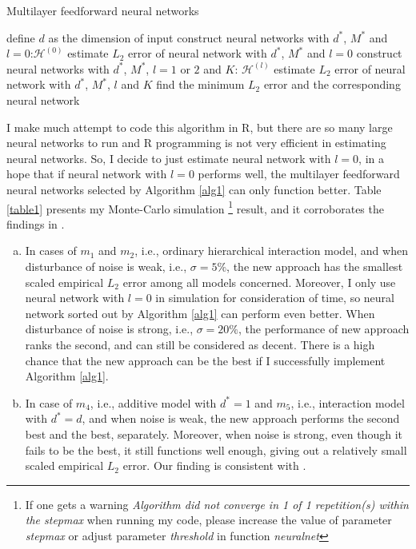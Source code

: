 \begin{tcolorbox}[standard jigsaw, opacityback=0]
\begin{algorithm}[H]
\caption{Multilayer feedforward neural networks}
\label{alg1}
\begin{algorithmic}[1]
\State define $d$ as the dimension of input
\State construct neural networks with $d^*$, $M^*$ and $l=0$:$\mathcal{H}^{(0)}$
\State estimate $L_2$ error of neural network with $d^*$, $M^*$ and $l=0$
\State construct neural networks with $d^*$, $M^*$, $l=1$ or $2$ and $K$: $\mathcal{H}^{(l)}$
\State estimate $L_2$ error of neural network with $d^*$, $M^*$, $l$ and $K$
\EndFor
\EndFor
\EndFor
\EndFor
\State find the minimum $L_2$ error and the corresponding neural network
\end{algorithmic}
\end{algorithm}
\end{tcolorbox}

I make much attempt to code this algorithm in R, but there are so many large neural networks to run and R programming is not very efficient in estimating neural networks. So, I decide to just estimate neural network with $l=0$, in a hope that if neural network with $l=0$ performs well, the multilayer feedforward neural networks selected by Algorithm \ref{alg1} can only function better. Table \ref{table1} presents my Monte-Carlo simulation \footnote{If one gets a warning \textit{Algorithm did not converge in 1 of 1 repetition(s) within the stepmax} when running my code, please increase the value of parameter \textit{stepmax} or adjust parameter \textit{threshold} in function \textit{neuralnet}} result, and it corroborates the findings in \cite{Bauer2019}.

\begin{enumerate}[(a)]
\item In cases of $m_1$ and $m_2$, i.e., ordinary hierarchical interaction model, and when disturbance of noise is weak, i.e., $\sigma=5\%$, the new approach has the smallest scaled empirical $L_2$ error among all models concerned. Moreover, I only use neural network with $l=0$ in simulation for consideration of time, so neural network sorted out by Algorithm \ref{alg1} can perform even better. When disturbance of noise is strong, i.e., $\sigma=20\%$, the performance of new approach ranks the second, and can still be considered as decent. There is a high chance that the new approach can be the best if I successfully implement Algorithm \ref{alg1}.

\item In case of $m_4$, i.e., additive model with $d^*=1$ and $m_5$, i.e., interaction model with $d^*=d$, and when noise is weak, the new approach performs the second best and the best, separately. Moreover, when noise is strong, even though it fails to be the best, it still functions well enough, giving out a relatively small scaled empirical $L_2$ error. Our finding is consistent with \cite{Bauer2019}.
\end{enumerate}

